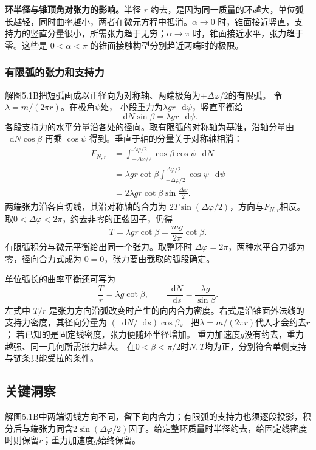 \documentclass[UTF8,fontset=fandol,a4paper,11pt]{ctexart}
\newcommand{\dd}{\mathop{}\!\mathrm{d}}
\begin{document}
\textbf{环半径与锥顶角对张力的影响。}半径 $r$ 约去，是因为同一质量的环越大，单位弧长越轻，同时曲率越小，两者在微元方程中抵消。$\alpha\to0$ 时，锥面接近竖直，支持力的竖直分量很小，所需张力趋于无穷；$\alpha\to\pi$ 时，锥面接近水平，张力趋于零。这些是 $0<\alpha<\pi$ 的锥面接触构型分别趋近两端时的极限。
\subsubsection*{有限弧的张力和支持力}
解图5.1B把短弧画成以正径向为对称轴、两端极角为$\pm\Delta\varphi/2$的有限弧。
令$\lambda=m/(2\pi r)$。在极角$\psi$处，
小段重力为$\lambda gr\,\dd\psi$，竖直平衡给
\[
\dd N\sin\beta=\lambda gr\,\dd\psi.
\]
各段支持力的水平分量沿各处的径向。取有限弧的对称轴为基准，沿轴分量由 $\dd N\cos\beta$ 再乘 $\cos\psi$ 得到。垂直于轴的分量关于对称轴相消：
\[
\begin{aligned}
F_{N,r}
&=\int_{-\Delta\varphi/2}^{\Delta\varphi/2}
\cos\beta\cos\psi\,\dd N\\
&=\lambda gr\cot\beta
\int_{-\Delta\varphi/2}^{\Delta\varphi/2}\cos\psi\,\dd\psi\\
&=2\lambda gr\cot\beta\sin\frac{\Delta\varphi}2.
\end{aligned}
\]
两端张力沿各自切线，其沿对称轴的合力为
$2T\sin(\Delta\varphi/2)$，方向与$F_{N,r}$相反。
取$0<\Delta\varphi<2\pi$，约去非零的正弦因子，仍得
\[
T=\lambda gr\cot\beta=\frac{mg}{2\pi}\cot\beta.
\]
有限弧积分与微元平衡给出同一个张力。取整环时 $\Delta\varphi=2\pi$，两种水平合力都为零，径向合力式成为 $0=0$，张力要由截取的弧段确定。

单位弧长的曲率平衡还可写为
\[
\frac Tr=\lambda g\cot\beta,\qquad
\frac{\dd N}{\dd s}=\frac{\lambda g}{\sin\beta}.
\]
左式中 $T/r$ 是张力方向沿弧改变时产生的向内合力密度。右式是沿锥面外法线的支持力密度，其径向分量为 $(\dd N/\dd s)\cos\beta$。
把$\lambda=m/(2\pi r)$代入才会约去$r$；
若已知的是固定线密度，张力便随环半径增加。
重力加速度$g$没有约去，重力越强、同一几何所需张力越大。
在$0<\beta<\pi/2$时$N,T$均为正，分别符合单侧支持与链条只能受拉的条件。




\subsection*{关键洞察}

解图5.1B中两端切线方向不同，留下向内合力；有限弧的支持力也须逐段投影，积分后与端张力同含$2\sin(\Delta\varphi/2)$因子。给定整环质量时半径约去，给固定线密度时则保留$r$；重力加速度$g$始终保留。
\end{document}
